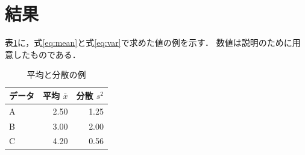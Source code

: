 \section{結果}\label{sec:results}

表\ref{tab:values}に，式\eqref{eq:mean}と式\eqref{eq:var}で求めた値の例を示す．
数値は説明のために用意したものである．

\begin{table}[t]
  \centering
  \caption{平均と分散の例}
  \label{tab:values}
  \begin{tabular}{lrr}
    \toprule
    データ & 平均 $\bar{x}$ & 分散 $s^2$ \\
    \midrule
    A & 2.50 & 1.25 \\
    B & 3.00 & 2.00 \\
    C & 4.20 & 0.56 \\
    \bottomrule
  \end{tabular}
\end{table}
